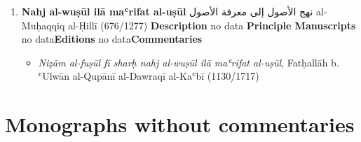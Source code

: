 \documentclass{article}
\begin{document}
\begin{enumerate}
      \item \textbf{Nahj al-wuṣūl ilā maʿrifat al-uṣūl}
        \newline
        \textarabic{نهج الأصول إلى معرفة الأصول}
        \newline
        al-Muḥaqqiq al-Ḥillī
        \newline
        (676/1277)
        \newline
        \newline
        \textbf{Description}
        \newline	
        no data
        \newline
        \newline
    \textbf{Principle Manuscripts}
\newline
no data\newline\textbf{Editions}
\newline
no data\newline\textbf{Commentaries}
\begin{itemize}
              \item \emph{Niẓām al-fuṣūl fī sharḥ nahj al-wuṣūl ilā maʿrifat al-uṣūl}, Fatḥallāh b. ʿUlwān al-Qupānī al-Dawraqī al-Kaʿbī (1130/1717)
            \end{itemize}
\end{enumerate}\section{Monographs without commentaries}
\end{document}
